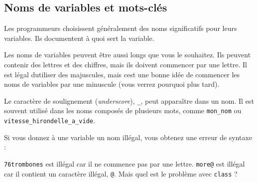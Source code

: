 \hypertarget{noms-de-variables-et-mots-cluxe9s}{%
\subsection{Noms de variables et
mots-clés}\label{noms-de-variables-et-mots-cluxe9s}}

Les programmeurs choisissent généralement des noms significatifs pour
leurs variables. Ils documentent à quoi sert la variable.

Les noms de variables peuvent être aussi longs que vous le souhaitez.
Ils peuvent contenir des lettres et des chiffres, mais ils doivent
commencer par une lettre. Il est légal d\textquotesingle utiliser des
majuscules, mais c\textquotesingle est une bonne idée de commencer les
noms de variables par une minuscule (vous verrez pourquoi plus tard).

Le caractère de soulignement (\emph{underscore}), \texttt{\_}, peut
apparaître dans un nom. Il est souvent utilisé dans les noms composés de
plusieurs mots, comme \texttt{mon\_nom} ou
\texttt{vitesse\_hirondelle\_a\_vide}.

Si vous donnez à une variable un nom illégal, vous obtenez une erreur de
syntaxe :

\begin{Shaded}
\begin{Highlighting}[]
\NormalTok{    \^{}}
\NormalTok{          \^{}}
\NormalTok{            \^{}}
\end{Highlighting}
\end{Shaded}

\texttt{76trombones} est illégal car il ne commence pas par une lettre.
\texttt{more@} est illégal car il contient un caractère illégal,
\texttt{@}. Mais quel est le problème avec \texttt{class} ?


